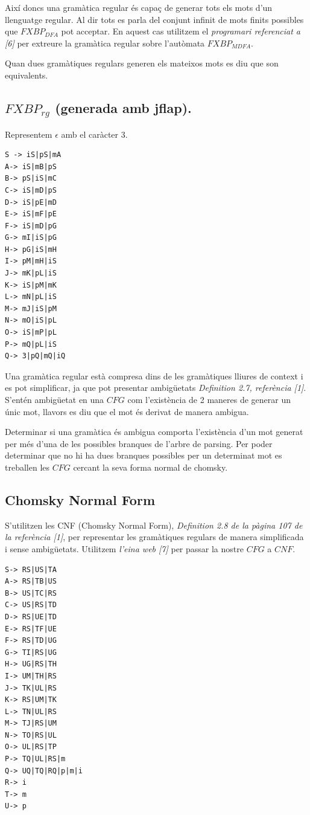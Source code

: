 \documentclass[12pt,a4paper]{report}
\def \dfa{$FXBP_{DFA} $}
\def \mfa{$FXBP_{MDFA} $}
\def \rg{$FXBP_{rg} $}
\begin{document}
Així doncs una gramàtica regular és capaç de generar tots els mots d’un llenguatge regular. Al dir tots es parla del conjunt infinit de mots finits possibles que \dfa{} pot acceptar. En aquest cas utilitzem el \textit{programari referenciat a [6]} per extreure la gramàtica regular sobre l’autòmata \mfa{}. 

\begin{center}
Quan dues gramàtiques regulars generen els mateixos mots es diu que son equivalents.
\end{center}

\subsection{\rg{} (generada amb jflap).}

Representem $\epsilon$ amb el caràcter 3. 

\begin{lstlisting}
S -> iS|pS|mA
A-> iS|mB|pS
B-> pS|iS|mC
C-> iS|mD|pS
D-> iS|pE|mD
E-> iS|mF|pE
F-> iS|mD|pG
G-> mI|iS|pG
H-> pG|iS|mH
I-> pM|mH|iS
J-> mK|pL|iS
K-> iS|pM|mK
L-> mN|pL|iS
M-> mJ|iS|pM
N-> mO|iS|pL
O-> iS|mP|pL
P-> mQ|pL|iS
Q-> 3|pQ|mQ|iQ
\end{lstlisting}

Una gramàtica regular està compresa dins de les gramàtiques lliures de context i es pot simplificar, ja que pot presentar ambigüetats \textit{Definition 2.7, referència [1]}. S’entén ambigüetat en una $CFG$ com l’existència de 2 maneres de generar un únic mot, llavors es diu que el mot és derivat de manera ambigua.

Determinar si una gramàtica és ambigua comporta l’existència d’un mot generat per més d’una de les possibles branques de l’arbre de parsing. Per poder determinar que no hi ha dues branques possibles per un determinat mot es treballen les $CFG$ cercant la seva forma normal de chomsky. 

\subsection{Chomsky Normal Form}

S’utilitzen les CNF (Chomsky Normal Form), \textit{Definition 2.8 de la pàgina 107 de la referència [1]}, per representar les gramàtiques regulars de manera simplificada i sense ambigüetats. Utilitzem \textit{l’eina web [7]} per passar la nostre $CFG$ a $CNF$. 

\begin{lstlisting}
S-> RS|US|TA
A-> RS|TB|US
B-> US|TC|RS
C-> US|RS|TD
D-> RS|UE|TD
E-> RS|TF|UE
F-> RS|TD|UG
G-> TI|RS|UG
H-> UG|RS|TH
I-> UM|TH|RS
J-> TK|UL|RS
K-> RS|UM|TK
L-> TN|UL|RS
M-> TJ|RS|UM
N-> TO|RS|UL
O-> UL|RS|TP
P-> TQ|UL|RS|m
Q-> UQ|TQ|RQ|p|m|i
R-> i
T-> m
U-> p

\end{lstlisting}
\end{document}
